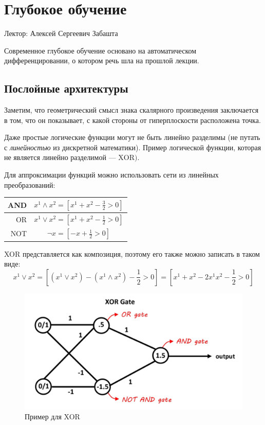 \chapter{Глубокое обучение}

Лектор: Алексей Сергеевич Забашта

\begin{remark}
    Современное глубокое обучение основано на автоматическом дифференцировании, о котором речь шла на прошлой лекции.
\end{remark}

\section{Послойные архитектуры}

Заметим, что геометрический смысл знака скалярного произведения заключается в том, что он показывает, с какой стороны от гиперплоскости расположена точка.

\begin{remark}
    Даже простые логические функции могут не быть линейно разделимы (не путать с \textit{линейностью} из дискретной математики). Пример логической функции, которая не является линейно разделимой --- $\mathrm{XOR})$.
\end{remark}

Для аппроксимации функций можно использовать сети из линейных преобразований:
\begin{table}[htb]
    \centering
    \begin{tabular}{|r|c|}
        \hline
        AND & $x^1\land x^2=[x^1+x^2-\frac{3}{2}>0]$ \\ \hline
        OR  & $x^1\lor x^2=[x^1+x^2-\frac{1}{2}>0]$  \\ \hline
        NOT & $\neg x=[-x+\frac{1}{2}>0]$            \\ \hline
    \end{tabular}
\end{table}

XOR представляется как композиция, поэтому его также можно записать в таком виде:
\[
    x^1\vee x^2=[(x^1\lor x^2)-(x^1\land x^2)-\dfrac{1}{2}>0]=[x^1+x^2-2x^1x^2-\dfrac{1}{2}>0]
\]

\begin{figure}[htb]
    \centering
    \includegraphics[scale=0.3]{./images/xor-graph.png}
    \caption{Пример для XOR}
\end{figure}

